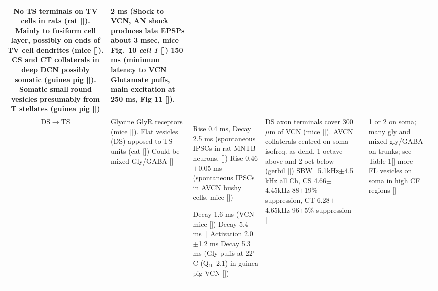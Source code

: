 \begin{longtable}{cYYYYYY}
No TS terminals on TV cells in rats (rat []).
Mainly to fusiform cell layer, possibly on ends of TV cell dendrites (mice []). 
CS and CT collaterals in deep DCN possibly somatic (guinea pig []).
Somatic small round vesicles presumably from T stellates  (guinea pig [])   
                                & %
2 ms (Shock to VCN, AN shock produces late EPSPs about 3 msec, mice Fig.~10 \textit{cell 1} [])
150 ms (minimum latency to VCN Glutamate puffs, main excitation at 250 ms,  Fig 11 []).
\\ \midrule
DS\ensuremath{\rightarrow}TS                        
                                & %
Glycine GlyR receptors (mice []).
Flat vesicles (DS) apposed to TS units (cat [])     
Could be mixed Gly/GABA [] 
                                & %
Rise 0.4 ms, Decay 2.5 ms (spontaneous IPSCs in rat MNTB neurons, [])
Rise 0.46$\pm$0.05 ms (spontaneous IPSCs in AVCN bushy cells, mice [])


Decay 1.6 ms (VCN mice [])
Decay 5.4 ms []    
Activation 2.0$\pm$1.2 ms Decay 5.3 ms (Gly puffs at 22$^\circ$C (Q$_{10}$ 2.1) in  guinea pig VCN [])
                                & %
DS axon terminals cover 300 $\mu$m of VCN (mice []).
AVCN collaterals centred on soma isofreq. as dend, 1 octave above and 2 oct below (gerbil []) 
SBW=5.1kHz$\pm$4.5 kHz all Ch, CS 4.66$\pm$4.45kHz 88$\pm$19\% suppression, CT 6.28$\pm$ 4.65kHz    96$\pm$5\% suppression []
                                & %

                                & %
1 or 2 on soma; many gly and mixed gly/GABA on trunks; see Table 1[] 
more FL vesicles on soma in high CF regions []      


\end{longtable}
